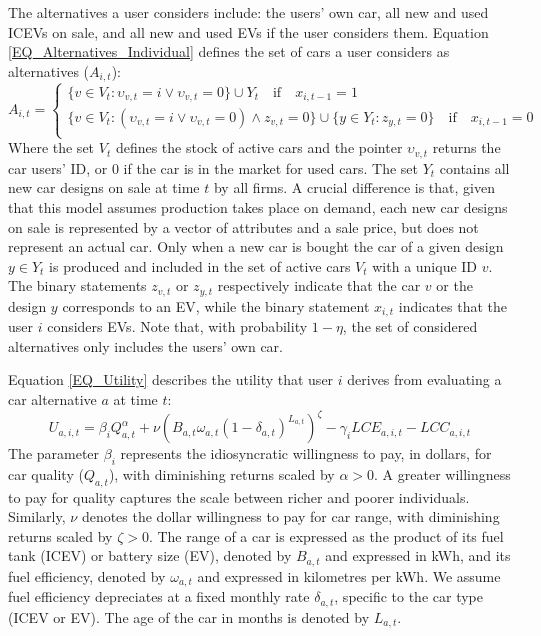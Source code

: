 \documentclass[12pt]{article}
\begin{document}
	The alternatives a user considers include: the users' own car, all new and used ICEVs on sale, and all new and used EVs if the user considers them. Equation \ref{EQ_Alternatives_Individual} defines the set of cars a user considers as alternatives ($A_{i,t}$): 
	\begin{equation}
		A_{i,t} = \begin{cases}
			\{v\in{V_t}:\upsilon_{v,t}=i\vee\upsilon_{v,t}=0\}\cup{Y_t}\quad\text{if}\quad{x_{i,t-1}=1}\\
			\{v\in{V_t}:(\upsilon_{v,t}=i\vee\upsilon_{v,t}=0)\wedge{z_{v,t}=0}\}\cup\{y\in{Y_{t}}:{z_{y,t}=0}\}\quad\text{if}\quad{x_{i,t-1}=0}\\
		\end{cases}
		\label{EQ_Alternatives_Individual}
	\end{equation}
	Where the set $V_t$ defines the stock of active cars and the pointer $\upsilon_{v,t}$ returns the car users' ID, or $0$ if the car is in the market for used cars. The set $Y_t$ contains all new car designs on sale at time $t$ by all firms. A crucial difference is that, given that this model assumes production takes place on demand, each new car designs on sale is represented by a vector of attributes and a sale price, but does not represent an actual car. Only when a new car is bought the car of a given design $y\in{Y_t}$ is produced and included in the set of active cars $V_t$ with a unique ID $v$.
	The binary statements $z_{v,t}$ or $z_{y,t}$ respectively indicate that the car $v$ or the design $y$ corresponds to an EV, while the binary statement $x_{i,t}$ indicates that the user $i$ considers EVs. Note that, with probability $1-\eta$, the set of considered alternatives only includes the users' own car.
	
Equation \ref{EQ_Utility} describes the utility that user $i$ derives from evaluating a car alternative $a$ at time $t$:
\begin{equation}
    U_{a,i,t} = \beta_i Q_{a,t}^\alpha + \nu (B_{a,t}\omega_{a,t}(1-\delta_{a,t})^{L_{a,t}})^{\zeta} 
                - \gamma_i LCE_{a,i,t} - LCC_{a,i,t}
    \label{EQ_Utility}
\end{equation}
The parameter $\beta_i$ represents the idiosyncratic willingness to pay, in dollars, for car quality ($Q_{a,t}$), with diminishing returns scaled by $\alpha>0$. A greater willingness to pay for quality captures the scale between richer and poorer individuals. Similarly, $\nu$ denotes the dollar willingness to pay for car range, with diminishing returns scaled by $\zeta>0$. The range of a car is expressed as the product of its fuel tank (ICEV) or battery size (EV), denoted by $B_{a,t}$ and expressed in kWh, and its fuel efficiency, denoted by $\omega_{a,t}$ and expressed in kilometres per kWh. We assume fuel efficiency depreciates at a fixed monthly rate $\delta_{a,t}$, specific to the car type (ICEV or EV). The age of the car in months is denoted by $L_{a,t}$. 
\end{document}
